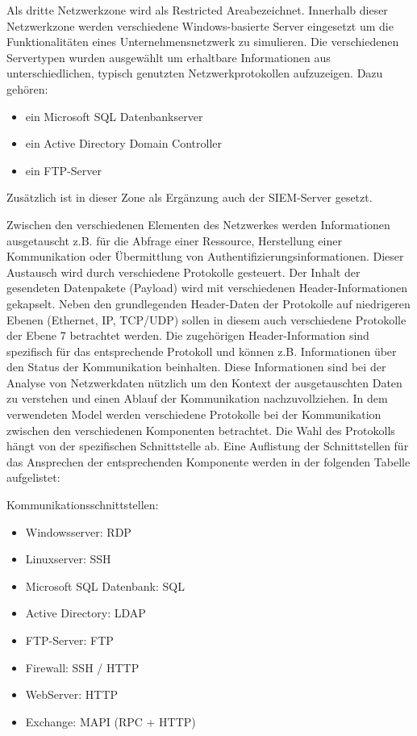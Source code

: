 Als dritte Netzwerkzone wird als \glqq Restricted Area\grqq bezeichnet. Innerhalb dieser Netzwerkzone werden verschiedene Windows-basierte Server eingesetzt um die Funktionalitäten eines Unternehmensnetzwerk zu simulieren. Die verschiedenen Servertypen wurden ausgewählt um erhaltbare Informationen aus unterschiedlichen, typisch genutzten Netzwerkprotokollen aufzuzeigen. Dazu gehören: 
\begin{itemize}
\item ein Microsoft SQL Datenbankserver 
\item ein Active Directory Domain Controller 
\item ein FTP-Server
\end{itemize}

Zusätzlich ist in dieser Zone als Ergänzung auch der SIEM-Server gesetzt.

Zwischen den verschiedenen Elementen des Netzwerkes werden Informationen ausgetauscht z.B. für die Abfrage einer Ressource, Herstellung einer Kommunikation oder Übermittlung von Authentifizierungsinformationen. Dieser Austausch wird durch verschiedene Protokolle gesteuert. Der Inhalt der gesendeten Datenpakete (Payload) wird mit verschiedenen Header-Informationen gekapselt. Neben den grundlegenden Header-Daten der Protokolle auf niedrigeren Ebenen (Ethernet, IP, TCP/UDP) sollen in diesem auch verschiedene Protokolle der Ebene 7 betrachtet werden. Die zugehörigen Header-Information sind spezifisch für das entsprechende Protokoll und können z.B. Informationen über den Status der Kommunikation beinhalten. Diese Informationen sind bei der Analyse von Netzwerkdaten nützlich um den Kontext der ausgetauschten Daten zu verstehen und einen Ablauf der Kommunikation nachzuvollziehen.
In dem verwendeten Model werden verschiedene Protokolle bei der Kommunikation zwischen den verschiedenen Komponenten betrachtet. Die Wahl des Protokolls hängt von der spezifischen Schnittstelle ab. Eine Auflistung der Schnittstellen für das Ansprechen der entsprechenden Komponente werden in der folgenden Tabelle aufgelistet:

Kommunikationsschnittstellen:
\begin{itemize}
\item Windowsserver: RDP
\item Linuxserver: SSH
\item Microsoft SQL Datenbank: SQL
\item Active Directory: LDAP
\item FTP-Server: FTP
\item Firewall: SSH / HTTP
\item WebServer: HTTP
\item Exchange: MAPI (RPC + HTTP)
\end{itemize}

